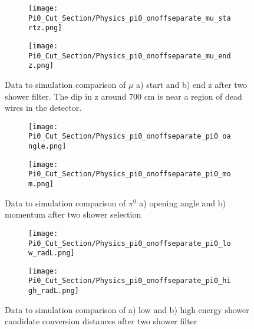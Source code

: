 \begin{figure}[H]
  \begin{subfigure}[t]{0.3\textwidth}
\texttt{[image: Pi0\_Cut\_Section/Physics\_pi0\_onoffseparate\_mu\_startz.png]}
  \caption{ }
  \end{subfigure} 
  \hspace{34mm}
  \begin{subfigure}[t]{0.3\textwidth}
\texttt{[image: Pi0\_Cut\_Section/Physics\_pi0\_onoffseparate\_mu\_endz.png]}
  \caption{ }
  \end{subfigure} 
\caption{ Data to simulation comparison of $\mu$ a) start and b) end z after two shower filter.  The dip in z around 700 cm is near a region of dead wires in the detector. }
\label{fig:physics_pi0_mu_z}
\end{figure}

\begin{figure}[H]
  \begin{subfigure}[t]{0.3\textwidth}
\texttt{[image: Pi0\_Cut\_Section/Physics\_pi0\_onoffseparate\_pi0\_oangle.png]} 
  \caption{ }
  \end{subfigure} 
  \hspace{34mm}
  \begin{subfigure}[t]{0.3\textwidth}
\texttt{[image: Pi0\_Cut\_Section/Physics\_pi0\_onoffseparate\_pi0\_mom.png]}
  \caption{ }
  \end{subfigure} 
\label{fig:physics_pi0_pi0_oangle}
\caption{ Data to simulation comparison of $\pi^0$ a) opening angle and b) momentum after two shower selection }
\end{figure}

\begin{figure}[H]
  \begin{subfigure}[t]{0.3\textwidth}
\texttt{[image: Pi0\_Cut\_Section/Physics\_pi0\_onoffseparate\_pi0\_low\_radL.png]}
  \caption{ }
  \end{subfigure} 
  \hspace{34mm}
  \begin{subfigure}[t]{0.3\textwidth}
\texttt{[image: Pi0\_Cut\_Section/Physics\_pi0\_onoffseparate\_pi0\_high\_radL.png]}
  \caption{ }
  \end{subfigure} 
\label{fig:physics_pi0_pi0_rl}
\caption{ Data to simulation comparison of a) low and b) high energy shower candidate conversion distances after two shower filter }
\end{figure}


